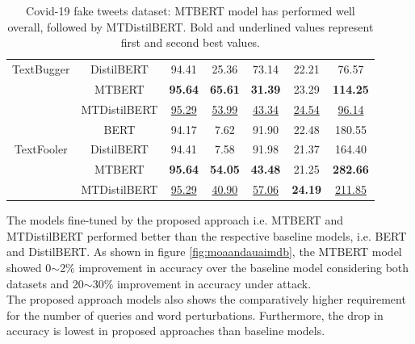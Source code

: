 \documentclass[%
	BCOR=8mm, %
	DIV=12,
	toc=bibliography, %
	toc=listof, %
	oneside, %
	egregdoesnotlikesansseriftitles, %
	]{scrbook}
\begin{document}
\begin{table}[H]
{\begin{tabular}{|c|c|c|c|c|c|c|}
TextBugger & DistilBERT &                94.41 &                    25.36 &                  73.14 &                     22.21 &            76.57 \\
                & MTBERT &               \textbf{95.64} &                    \textbf{65.61} &                  \textbf{31.39}&                     23.29 &           \textbf{114.25} \\
                & MTDistilBERT &                \underline{95.29} &                    \underline{53.99} &                  \underline{43.34} &                    \underline{24.54} &            \underline{96.14} \\
                \midrule
                 & BERT &                94.17 &                     7.62 &                  91.90 &                     22.48 &           180.55 \\
TextFooler & DistilBERT &                94.41 &                     7.58 &                  91.98 &                     21.37 &           164.40 \\
                & MTBERT &                \textbf{95.64} &                   \textbf{ 54.05} &                  \textbf{43.48} &                     21.25 &           \textbf{282.66} \\
                & MTDistilBERT &         \underline{95.29} &             \underline{40.90} &          \underline{57.06} &          \textbf{ 24.19} &     \underline{211.85} \\
                \bottomrule
        \end{tabular}
    }
    \caption[Experiment result of Covid-19 fake tweets]{Covid-19 fake tweets dataset: MTBERT model has performed well overall, followed by MTDistilBERT.  Bold and underlined values represent first and second best values.}
    \label{table:FakeNewsExpRes}
\end{table}
The models fine-tuned by the proposed approach i.e. MTBERT and MTDistilBERT  performed better than the respective baseline models, i.e. BERT and DistilBERT.  As shown in figure \ref{fig:moaandauaimdb}, the MTBERT model showed 0$\sim$2\% improvement in accuracy over the baseline model considering both datasets and 20$\sim$30\% improvement in accuracy under attack. \\
The proposed approach models also shows the comparatively higher requirement for the number of queries and word perturbations. Furthermore, the drop in accuracy is lowest in proposed approaches than baseline models.
\end{document}
